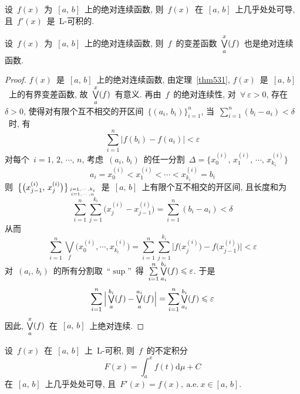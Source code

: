 \begin{corollary} \label{cor531}
设~$f(x)$~为~$[a,\,b]$~上的绝对连续函数, 则~$f(x)$~在~$[a,\,b]$~上几乎处处可导, 且~$f'(x)$~是~L-可积的.
\end{corollary}

\begin{theorem}
设~$f(x)$~为~$[a,\,b]$~上的绝对连续函数, 则~$f$~的变差函数~$\mathop{\textstyle{\bigvee}}\limits_a^x(f)$~也是绝对连续函数.
\end{theorem}

\begin{proof}
$f(x)$~是~$[a,\,b]$~上的绝对连续函数, 由定理~\ref{thm531}, $f(x)$~是~$[a,\,b]$~上的有界变差函数, 故~$\mathop{\textstyle{\bigvee}}\limits_a^x(f)$~有意义. 再由~$f$~的绝对连续性, 对~$\forall~\varepsilon>0$, 存在~$\delta > 0$, 使得对有限个互不相交的开区间~$\big\{(a_i,\,b_i)\big\}_{i=1}^n$, 当~$\sum\limits_{i=1}^n (b_i-a_i) < \delta$~时, 有
\[
\sum_{i=1}^n \big| f(b_i)-f(a_i) \big| < \varepsilon
\]
对每个~$i = 1, \, 2,\, \cdots,\, n$, 考虑~$(a_i,\,b_i)$~的任一分割~$\Delta=\big\{x_0^{(i)},\,x_1^{(i)},\,\cdots,\,x_{k_i}^{(i)}\big\}$
\[
a_i = x_0^{(i)} <  x_1^{(i)} < \cdots <  x_{k_i}^{(i)} = b_i
\]
则~$\big\{ \big( x_{j-1}^{(i)},\, x_j^{(i)} \big) \big\}_{{j=1,\cdots,k_i} \atop {i=1,\cdots,n}}$~是~$[a,\,b]$~上有限个互不相交的开区间, 且长度和为
\[
\sum_{i=1}^n \sum_{j=1}^{k_i} \big( x_j^{(i)} - x_{j-1}^{(i)} \big) = \sum_{i=1}^n (b_i - a_i) < \delta
\]
从而
\[
\sum_{i=1}^n {\textstyle{\bigvee}}_{f} \big( x_0^{(i)},\cdots,x_{k_i}^{(i)} \big) = \sum_{i=1}^n \sum_{j=1}^{k_i} \big| f\big(x_j^{(i)}\big) - f\big(x_{j-1}^{(i)}\big) \big| < \varepsilon
\]
对~$(a_i,\,b_i)$~的所有分割取~``$\sup$''~得~$\sum\limits_{i=1}^n \mathop{\textstyle{\bigvee}}\limits_{a_i}^{b_i}(f) \leqslant \varepsilon$. 于是
\[
\sum_{i=1}^n \Big| \mathop{\textstyle{\bigvee}}_a^{b_i}(f) - \mathop{\textstyle{\bigvee}}_a^{a_i}(f) \Big| = \sum_{i=1}^n \mathop{\textstyle{\bigvee}}_{a_i}^{b_i}(f) \leqslant \varepsilon
\]
因此, $\mathop{\textstyle{\bigvee}}\limits_a^x(f)$~在~$[a,\,b]$~上绝对连续.
\end{proof}

\begin{theorem} \label{thm533}
设~$f(x)$~在~$[a,\,b]$~上~L-可积, 则~$f$~的不定积分
\[
F(x) = \int_a^x f(t) \mathrm{d} \mu + C
\]
在~$[a,\,b]$~上几乎处处可导, 且~$F'(x) = f(x), \mathrm{~a.e.~} x \in [a,\,b]$.
\end{theorem}

